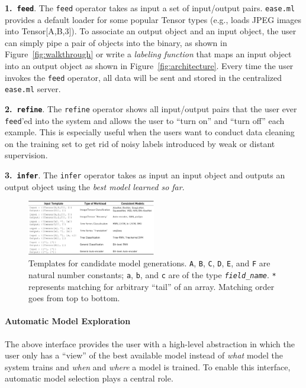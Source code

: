\documentclass[letterpaper]{vldb}
\newcommand{\eml}{\texttt{ease.ml}\xspace}
\begin{document}
\noindent
{\textbf{1.~\texttt{feed}}.} The \texttt{feed} operator takes
as input a set of input/output pairs. \eml provides
a default loader for some popular Tensor types (e.g., loads
JPEG images into Tensor[A,B,3]). To associate an output
object and an input object, the user can simply pipe a pair of
objects into the binary, as shown in Figure~\ref{fig:walkthrough} or
write a {\em labeling function} that maps an input
object into an output object as shown in Figure~\ref{fig:architecture}.
Every time the user invokes the \texttt{feed} operator,
all data will be sent and stored in the centralized
\eml server.

\noindent
{\textbf{2.~\texttt{refine}}.} The \texttt{refine} operator
shows all input/output pairs that the user ever \texttt{feed}'ed
into the system and allows the user to ``turn on''
and ``turn off'' each example. This is especially useful when
the users want to conduct data cleaning on the training set
to get rid of noisy labels introduced by weak or distant supervision.

\noindent
{\textbf{3.~\texttt{infer}}.} The \texttt{infer} operator
takes as input an input object and outputs an output object
using the {\em best model learned so far}.


\begin{figure}[t]
\centering
\includegraphics[width=0.5\textwidth]{figures/models}
\vspace{-2em}
\caption{Templates for candidate model generations. \texttt{A},
\texttt{B}, \texttt{C}, \texttt{D}, \texttt{E}, and \texttt{F}
are natural number constants; \texttt{a}, \texttt{b}, and \texttt{c} are of the type \texttt{\em field\_name}. \texttt{*} represents
matching for arbitrary ``tail'' of an array. Matching order
goes from top to bottom.}
\label{fig:templates}
\vspace{-1em}
\end{figure}


\paragraph*{Automatic Model Exploration}

The above interface provides the user with a high-level abstraction
in which the user only has a ``view'' of the best available model
instead of {\em what} model the system trains and 
{\em when} and {\em where} a model is trained. To enable 
this interface, automatic model selection plays a
central role.
\end{document}
